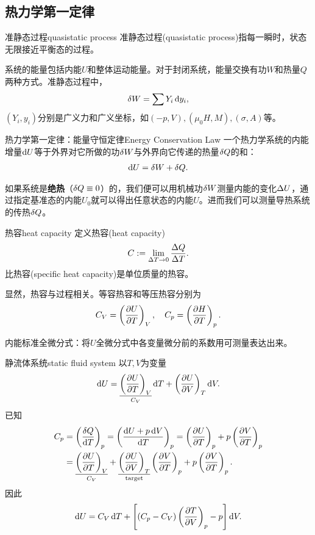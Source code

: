 \subsection{热力学第一定律}
\begin{definition}{准静态过程}{quasistatic process}
	准静态过程(quasistatic process)指每一瞬时，状态无限接近平衡态的过程。
\end{definition}

系统的能量包括内能$U$和整体运动能量。对于封闭系统，能量交换有功$W$和热量$Q$两种方式。准静态过程中，
\begin{align}
	\mathop{}\!\delta W=\sum Y_i\mathop{}\!\mathrm{d} y_i,
\end{align}
$(Y_i,y_i)$分别是广义力和广义坐标，如$(-p,V),(\mu_0H,M),(\sigma,A)$等。
\begin{theorem}{热力学第一定律：能量守恒定律}{Energy Conservation Law}
	一个热力学系统的内能增量$\mathop{}\!\mathrm{d} U$等于外界对它所做的功$\mathop{}\!\delta W$与外界向它传递的热量$\mathop{}\!\delta Q$的和：
	\begin{align}
		\mathop{}\!\mathrm{d} U=\mathop{}\!\delta W+\mathop{}\!\delta Q.
	\end{align}
\end{theorem}
\indent 如果系统是\textbf{绝热}（$\mathop{}\!\delta Q\equiv 0$）的，我们便可以用机械功$\mathop{}\!\delta W$测量内能的变化$\Delta U$，通过指定基准态的内能$U_0$就可以得出任意状态的内能$U$。进而我们可以测量导热系统的传热$\mathop{}\!\delta Q$。
\begin{definition}{热容}{heat capacity}
	定义热容(heat capacity)
	\begin{equation}
		C:=\lim_{\Delta T\to0}\frac{\Delta Q}{\Delta T}.
	\end{equation}
	比热容(specific heat capacity)是单位质量的热容。
\end{definition}
显然，热容与过程相关。等容热容和等压热容分别为
\begin{align}
	C_V=\kh{\pv UT}_V,\quad C_p=\kh{\pv HT}_p.
\end{align}

内能标准全微分式：将$U$全微分式中各变量微分前的系数用可测量表达出来。
\begin{example}{静流体系统}{static fluid system}
	以$T,V$为变量
	\[
		\d U=\underset{C_V}{\underline{\kh{\pv UT}_V}}\d T+\kh{\pv UV}_T\d V.
	\]
	已知 
	\begin{align*}
		C_p&=\kh{\frac{\vd Q}{\d T}}_p=\kh{\frac{\d U+p\d V}{\d T}}_p=\kh{\pv UT}_p+p\kh{\pv VT}_p\\
		&=\underset{C_V}{\underline{\kh{\pv UT}_V}}+\underset{\text{target}}{\underline{\kh{\pv UV}_T}}\kh{\pv VT}_p+p\kh{\pv VT}_p.
	\end{align*}
	因此
	\begin{align}
		\mathop{}\!\mathrm{d} U=C_V\mathop{}\!\mathrm{d} T+\left[(C_p-C_V)\left(\frac{\partial^{\;\!\!}T}{\partial V^{\;\!\!}}\right)_p-p\right]\mathop{}\!\mathrm{d} V.
	\end{align}
\end{example}
